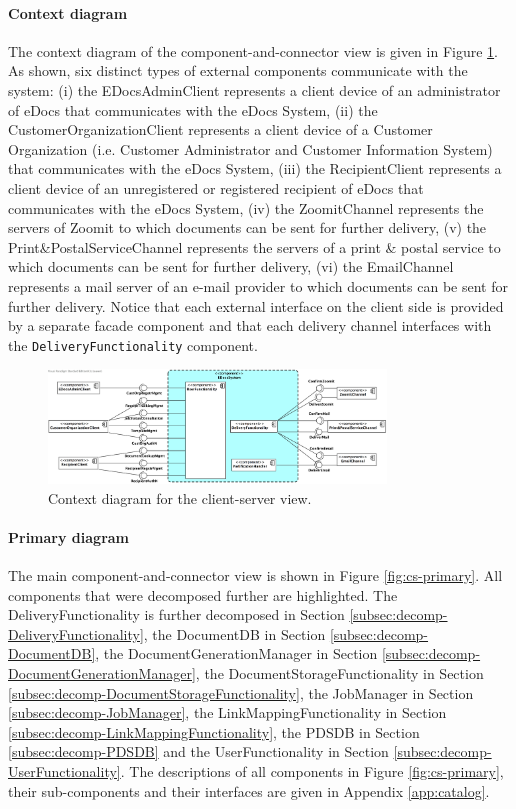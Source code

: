 \documentclass[a4paper,10pt]{article}
\begin{document}
\paragraph{Context diagram}
The context diagram of the component-and-connector view is given in Figure \ref{fig:cc-context}. As shown, six distinct types of external components communicate with the system:
(i) the EDocsAdminClient represents a client device of an administrator of eDocs that communicates with the eDocs System,
(ii) the CustomerOrganizationClient represents a client device of a Customer Organization (i.e. Customer Administrator and Customer Information System) that communicates with the eDocs System,
(iii) the RecipientClient represents a client device of an unregistered or registered recipient of eDocs that communicates with the eDocs System,
(iv) the ZoomitChannel represents the servers of Zoomit to which documents can be sent for further delivery,
(v) the Print\&PostalServiceChannel represents the servers of a print \& postal service to which documents can be sent for further delivery,
(vi) the EmailChannel represents a mail server of an e-mail provider to which documents can be sent for further delivery.
Notice that each external interface on the client side is provided by a separate facade component and that each delivery channel interfaces with the \texttt{DeliveryFunctionality} component.

\begin{figure}[!htp]
	\centering
	\includegraphics[width=0.8\textwidth]{ContextDiagram.png}
	\caption{Context diagram for the client-server view.}
	\label{fig:cc-context}
\end{figure}
\FloatBarrier

\paragraph{Primary diagram}
The main component-and-connector view is shown in Figure \ref{fig:cs-primary}. All components that were decomposed further are highlighted. The DeliveryFunctionality is further decomposed in Section \ref{subsec:decomp-DeliveryFunctionality}, the DocumentDB in Section \ref{subsec:decomp-DocumentDB}, the DocumentGenerationManager in Section \ref{subsec:decomp-DocumentGenerationManager}, the DocumentStorageFunctionality in Section \ref{subsec:decomp-DocumentStorageFunctionality}, the JobManager in Section \ref{subsec:decomp-JobManager}, the LinkMappingFunctionality in Section \ref{subsec:decomp-LinkMappingFunctionality}, the PDSDB in Section \ref{subsec:decomp-PDSDB} and the UserFunctionality in Section \ref{subsec:decomp-UserFunctionality}. The descriptions of all components in Figure \ref{fig:cs-primary}, their sub-components and their interfaces are given in Appendix \ref*{app:catalog}.
\end{document}
